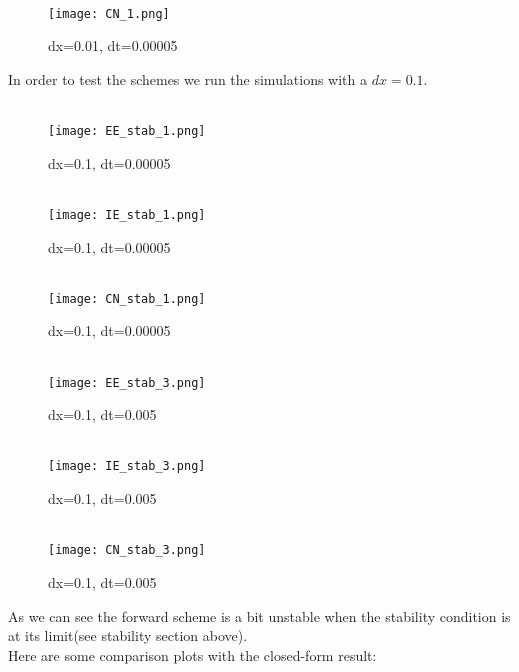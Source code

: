 \documentclass[a4paper,11pt]{article}
\newcommand{\vsp}{\vspace{0.2cm}}
\begin{document}
    \begin{figure}[H]
        \centering
        \\
        \texttt{[image: CN\_1.png]}
        \caption*{dx=0.01, dt=0.00005}
    \end{figure}
    In order to test the schemes we run the simulations with a $dx=0.1$.
    \begin{figure}[H]
        \centering
        \\
        \texttt{[image: EE\_stab\_1.png]}
        \caption*{dx=0.1, dt=0.00005}
    \end{figure}
    \begin{figure}[H]
        \centering
        \\
        \texttt{[image: IE\_stab\_1.png]}
        \caption*{dx=0.1, dt=0.00005}
    \end{figure}
    \begin{figure}[H]
        \centering
        \\
        \texttt{[image: CN\_stab\_1.png]}
        \caption*{dx=0.1, dt=0.00005}
    \end{figure}
    \begin{figure}[H]
        \centering
        \\
        \texttt{[image: EE\_stab\_3.png]}
        \caption*{dx=0.1, dt=0.005}
    \end{figure}
    \begin{figure}[H]
        \centering
        \\
        \texttt{[image: IE\_stab\_3.png]}
        \caption*{dx=0.1, dt=0.005}
    \end{figure}
    \begin{figure}[H]
        \centering
        \\
        \texttt{[image: CN\_stab\_3.png]}
        \caption*{dx=0.1, dt=0.005}
    \end{figure}
    As we can see the forward scheme is a bit unstable when the stability condition is at its limit(see stability section above).\vsp\\
    Here are some comparison plots with the closed-form result:
\end{document}

